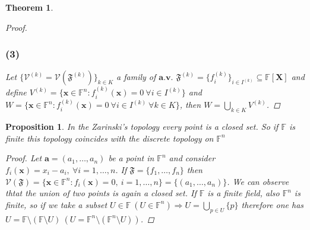 \documentclass{article}
\newtheorem{proposition}{Proposition}
\newtheorem{theorem}{Theorem}
\begin{document}
\begin{theorem}
\begin{proof}
                \subsubsection*{(3)}
                    Let $\{ \mathcal{V}^{(k)} = \mathcal{V}(\mathfrak{F}^{(k)}) \}_{k \in K}$ a family of $\textbf{a.v.}$ $\mathfrak{F}^{(k)} = \{ f_i^{(k)}\}_{i \in I^{(k)}} \subseteq \mathbb{F}[\textbf{X}]$ and define
                    $V^{(k)} = \{ \textbf{x} \in \mathbb{F}^n : f_i^{(k)}(\textbf{x}) = 0 \ \forall i \in I^{(k)}\}$ and  $W = \{ \textbf{x} \in \mathbb{F}^n : f_i^{(k)}(\textbf{x}) = 0 \ \forall i \in I^{(k)} \ \forall k \in K \}$, then $W = \bigcup_{k\in K} V^{(k)}$. 
            \end{proof} 
        \end{theorem}
        \begin{proposition}
            In the Zarinski's topology every point is a closed set. So if $\mathbb{F}$ is finite this topology coincides with the discrete topology on $\mathbb{F}^n$
            \begin{proof}
                Let $\textbf{a} = (a_1,\dots,a_n)$ be a point in $\mathbb{F}^n $ and consider $f_i(\textbf{x}) = x_i - a_i, \ \forall i=1,\dots,n$. If $\mathfrak{F} = \{ f_1,\dots,f_n \}$ then $\mathcal{V}(\mathfrak{F}) = \{ \textbf{x} \in \mathbb{F}^n : f_i(\textbf{x}) = 0, \ i=1,\dots,n\} = \{ (a_1,\dots,a_n) \}$. We can observe thtat the union of two points is again a closed set.
                If $\mathbb{F}$ is a finite field, also $\mathbb{F}^n$ is finite, so if we take a subset $U \in \mathbb{F} \ (U \in \mathbb{F}^n) \Rightarrow U = \bigcup_{p \in U}\{ p\}$ therefore one has $U = \mathbb{F}\setminus (\mathbb{F}\setminus U) \ (U = \mathbb{F}^n\setminus (\mathbb{F}^n\setminus U))$.
            \end{proof}
        \end{proposition} 
        \newpage 
\end{document}
